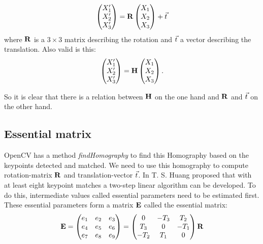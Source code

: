 \begin{equation} \label{eq:1}
    \begin{pmatrix}
        X_1' \\
        X_2' \\
        X_3'
    \end{pmatrix}
    = \mathbf{R}
    \begin{pmatrix}
        X_1 \\
        X_2 \\
        X_3
    \end{pmatrix}
    + \vec t
\end{equation}
where $\mathbf{R}$ is a $3 \times 3$ matrix describing the rotation and $\vec t$ a vector describing the translation. Also valid is this: 
\begin{equation}
    \begin{pmatrix}
        X_1' \\
        X_2' \\
        X_3'
    \end{pmatrix}
    = \mathbf{H}
    \begin{pmatrix}
        X_1 \\
        X_2 \\
        X_3
    \end{pmatrix}.
\end{equation} 

So it is clear that there is a relation between $\mathbf{H}$ on the one hand and $\mathbf{R}$ and $\vec t$ on the other hand.\bigskip

\subsection{Essential matrix}
OpenCV has a method \textit{findHomography} to find this Homography based on the keypoints detected and matched. We need to use this homography to compute rotation-matrix $\mathbf{R}$ and translation-vector $\vec t$. In \cite{improc} T. S. Huang proposed that with at least eight keypoint matches a two-step linear algorithm can be developed. To do this, intermediate values called essential parameters need to be estimated first. These essential parameters form a matrix $\mathbf{E}$ called the essential matrix:
\begin{equation}
    \mathbf{E} = 
    \begin{pmatrix}
        e_1&e_2&e_3 \\
        e_4&e_5&e_6 \\
        e_7&e_8&e_9 
    \end{pmatrix}
    = \begin{pmatrix}
        0&-T_3&T_2 \\
        T_3&0&-T_1 \\
        -T_2&T_1&0
    \end{pmatrix}
     \mathbf{R}
\end{equation}

